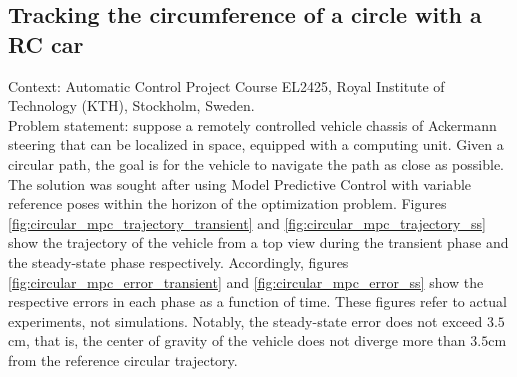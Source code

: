 \subsection{Tracking the circumference of a circle with a RC car}

Context: Automatic Control Project Course EL2425, Royal Institute of
Technology (KTH), Stockholm, Sweden.\\

Problem statement: suppose a remotely controlled vehicle chassis of Ackermann
steering that can be localized in space, equipped with a computing unit. Given a
circular path, the goal is for the vehicle to navigate the path as close as
possible. The solution was sought after using Model Predictive Control with
variable reference poses within the horizon of the optimization problem.
Figures \ref{fig:circular_mpc_trajectory_transient} and
\ref{fig:circular_mpc_trajectory_ss} show the trajectory of the vehicle from
a top view during the transient phase and the steady-state phase respectively.
Accordingly, figures \ref{fig:circular_mpc_error_transient} and
\ref{fig:circular_mpc_error_ss} show the respective errors in each phase as
a function of time. These figures refer to actual experiments, not simulations.
Notably, the steady-state error does not exceed $3.5$cm, that is, the center
of gravity of the vehicle does not diverge more than $3.5$cm from the reference
circular trajectory.


\noindent{}\\

